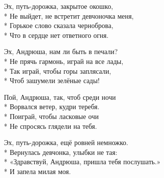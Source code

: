 \medskip

\begin{minipage}{\linewidth}
Эх, путь-дорожка, закрытое окошко,\\*
Не выйдет, не встретит девчоночка меня,\\*
Горькое слово сказала черноброва,\\*
Что в сердце нет ответного огня.\\
\end{minipage}\par\medskip\nobreak

\medskip

\begin{minipage}{\linewidth}
\hspace*{1.5em}Эх, Андрюша, нам ли быть в печали?\\*
\hspace*{1.5em}Не прячь гармонь, играй на все лады,\\*
\hspace*{1.5em}Так играй, чтобы горы заплясали,\\*
\hspace*{1.5em}Чтоб зашумели зелёные сады!\\
\end{minipage}\par\medskip\nobreak

\medskip

\begin{minipage}{\linewidth}
\hspace*{1.5em}Пой, Андрюша, так, чтоб среди ночи\\*
\hspace*{1.5em}Ворвался ветер, кудри теребя.\\*
\hspace*{1.5em}Поиграй, чтобы ласковые очи\\*
\hspace*{1.5em}Не спросясь глядели на тебя.\\
\end{minipage}\par\medskip\nobreak

\medskip

\begin{minipage}{\linewidth}
Эх, путь-дорожка, ещё ровней немножко.\\*
Вернулась девчонка, улыбки не тая:\\*
«Здравствуй, Андрюша, пришла тебя послушать.»\\*
И запела милая моя.\\
\end{minipage}\par\medskip\nobreak

